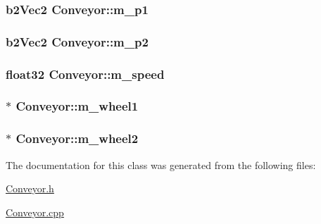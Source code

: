 \hypertarget{classConveyor_a113c9d44089b1538f7c35e6888366904}{
\subsubsection[{m\-\_\-p1}]{\setlength{\rightskip}{0pt plus 5cm}b2\-Vec2 Conveyor\-::m\-\_\-p1}}\label{classConveyor_a113c9d44089b1538f7c35e6888366904}
\hypertarget{classConveyor_aa1cd90bad95a21f56a56d8c468b366bf}{
\subsubsection[{m\-\_\-p2}]{\setlength{\rightskip}{0pt plus 5cm}b2\-Vec2 Conveyor\-::m\-\_\-p2}}\label{classConveyor_aa1cd90bad95a21f56a56d8c468b366bf}
\hypertarget{classConveyor_aada37ff91042927da34b025345c9350f}{
\subsubsection[{m\-\_\-speed}]{\setlength{\rightskip}{0pt plus 5cm}float32 Conveyor\-::m\-\_\-speed}}\label{classConveyor_aada37ff91042927da34b025345c9350f}
\hypertarget{classConveyor_add4c93f9cde9efd141ec813e429161b3}{
\subsubsection[{m\-\_\-wheel1}]{$\ast$ Conveyor\-::m\-\_\-wheel1}}\label{classConveyor_add4c93f9cde9efd141ec813e429161b3}
\hypertarget{classConveyor_a49272a7a68a6d1072c170fe4080c720b}{
\subsubsection[{m\-\_\-wheel2}]{$\ast$ Conveyor\-::m\-\_\-wheel2}}\label{classConveyor_a49272a7a68a6d1072c170fe4080c720b}


The documentation for this class was generated from the following files\-:\begin{DoxyCompactItemize}
\item 
\hyperlink{Conveyor_8h}{Conveyor.\-h}\item 
\hyperlink{Conveyor_8cpp}{Conveyor.\-cpp}\end{DoxyCompactItemize}

